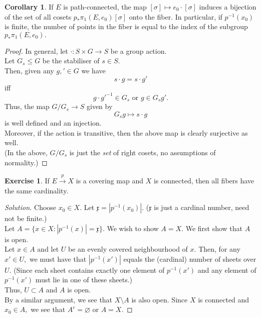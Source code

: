 \documentclass[12pt]{article}
\theoremstyle{definition}
\numberwithin{thm}{section}
\newtheorem{cor}[thm]{Corollary}
\newtheorem{exe}[thm]{Exercise}
\let\emptyset\varnothing
\newenvironment{soln}{\begin{proof}[Solution]}{\end{proof}}
\begin{document}
\begin{cor}
	If $E$ is path-connected, the map $[\sigma] \mapsto e_0\cdot[\sigma]$ induces a bijection of the set of all cosets $p_*\pi_1(E, e_0)[\sigma]$ onto the fiber. In particular, if $p^{-1}(x_0)$ is finite, the number of points in the fiber is equal to the index of the subgroup $p_*\pi_1(E, e_0).$
\end{cor}
\begin{proof} 
	In general, let $\cdot:S \times G \to S$ be a group action.\\
	Let $G_s \le G$ be the stabiliser of $s \in S.$\\
	Then, given any $g, ' \in G$ we have
	\begin{equation*} 
		s\cdot g = s\cdot g'
	\end{equation*}
	iff
	\begin{equation*} 
		g\cdot g'^{-1} \in G_s \text{ or } g \in G_sg'.
	\end{equation*}
	Thus, the map $G/G_s \to S$ given by
	\begin{equation*} 
		G_sg \mapsto s\cdot g
	\end{equation*}
	is well defined and an injection.\\
	Moreover, if the action is transitive, then the above map is clearly surjective as well.\\
	(In the above, $G/G_s$ is just the \emph{set} of right cosets, no assumptions of normality.) 
\end{proof}

\begin{exe}
	If $E\overset{p}{\longrightarrow}X$ is a covering map and $X$ is connected, then all fibers have the same cardinality.
\end{exe}
\begin{soln} 
	Choose $x_0 \in X.$ Let $\mathfrak{x} = |p^{-1}(x_0)|.$ ($\mathfrak{x}$ is just a cardinal number, need not be finite.)\\
	Let $A = \{x \in X : |p^{-1}(x)| = \mathfrak{x}\}.$ We wish to show $A = X.$ We first show that $A$ is open.\\
	Let $x \in A$ and let $U$ be an evenly covered neighbourhood of $x.$ Then, for any $x' \in U,$ we must have that $|p^{-1}(x')|$ equals the (cardinal) number of sheets over $U.$ (Since each sheet contains exactly one element of $p^{-1}(x')$ and any element of $p^{-1}(x')$ must lie in one of these sheets.)\\
	Thus, $U \subset A$ and $A$ is open.\\
	By a similar argument, we see that $X\setminus A$ is also open. Since $X$ is connected and $x_0 \in A,$ we see that $A^c = \emptyset$ or $A = X.$
\end{soln}
\end{document}
